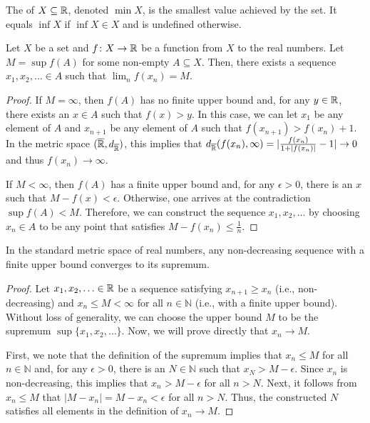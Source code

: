 \begin{definition}
The  of $X\subseteq \mathbb{R}$, denoted $\min X$, is the smallest value achieved by the set.
It equals $\inf X$ if $\inf X \in X$ and is undefined otherwise.
\end{definition}

\begin{lemma}
\label{lem:SupremumSequence}
Let $X$ be a set and $f \colon X\rightarrow \mathbb{R}$ be a function from $X$ to the real numbers.
Let $M = \sup f(A)$ for some non-empty $A \subseteq X$.
Then, there exists a sequence $x_1,x_2,\ldots \in A$ such that $\lim_n f(x_n) = M$.
\end{lemma}
\begin{proof}
If $M=\infty$, then $f(A)$ has no finite upper bound and, for any $y\in \mathbb{R}$, there exists an $x\in A$ such that $f(x)>y$.
In this case, we can let $x_1$ be any element of $A$ and $x_{n+1}$ be any element of $A$ such that $f(x_{n+1}) > f(x_n) + 1$.
In the metric space $(\overline{\mathbb{R}},d_{\overline{\mathbb{R}}})$, this implies that $d_{\overline{\mathbb{R}}}(f(x_n),\infty) = |\frac{f(x_n)}{1+|f(x_n)|} - 1| \to 0$ and thus $f(x_n) \to \infty$.

If $M<\infty$, then $f(A)$ has a finite upper bound and, for any $\epsilon >0$, there is an $x$ such that $M-f(x)<\epsilon$.
Otherwise, one arrives at the contradiction $\sup f(A) < M$.
Therefore, we can construct the sequence $x_1,x_2,\ldots$ by choosing $x_n\in A$ to be any point that satisfies $M-f(x_n)\leq \frac{1}{n}$.
\end{proof}

\begin{theorem}
In the standard metric space of real numbers, any non-decreasing sequence with a finite upper bound converges to its supremum.
\end{theorem}
\begin{proof}
Let $x_1,x_2,\ldots \in \mathbb{R}$ be a sequence satisfying $x_{n+1} \geq x_n$ (i.e., non-decreasing) and $x_n \leq M < \infty$ for all $n\in \mathbb{N}$ (i.e., with a finite upper bound).
Without loss of generality, we can choose the upper bound $M$ to be the supremum $\sup \{x_1,x_2,\ldots\}$.
Now, we will prove directly that $x_n \to M$.

First, we note that the definition of the supremum implies that $x_n \leq M$ for all $n\in \mathbb{N}$ and, for any $\epsilon >0$, there is an $N\in \mathbb{N}$ such that $x_N > M-\epsilon$.
Since $x_n$ is non-decreasing, this implies that $x_n > M-\epsilon$ for all $n>N$.
Next, it follows from $x_n \leq M$ that $|M - x_n| = M-x_n < \epsilon$ for all $n>N$.
Thus, the constructed $N$ satisfies all elements in the definition of $x_n \to M$.
\end{proof}


